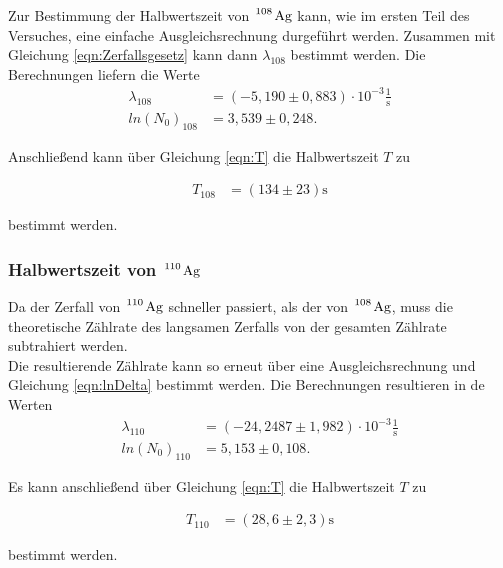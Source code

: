 Zur Bestimmung der Halbwertszeit von $\ce{^108 Ag}$ kann, wie im ersten Teil des Versuches, eine einfache Ausgleichsrechnung durgeführt werden. Zusammen mit
Gleichung \eqref{eqn:Zerfallsgesetz} kann dann $\lambda_{108}$ bestimmt werden. Die Berechnungen liefern die Werte
\begin{align*}
  \lambda_{108} &= (-5,190 \pm 0,883) \cdot 10^{-3} \frac{1}{\si{\second}} \\
  ln(N_0)_{108} &=  3,539 \pm 0,248.
\end{align*}

Anschließend kann über Gleichung \eqref{eqn:T} die Halbwertszeit $T$ zu

\begin{align*}
  T_{108} &= (134 \pm 23) \si{\second}
\end{align*}

bestimmt werden.


\subsubsection{Halbwertszeit von $\ce{^110 Ag}$}

Da der Zerfall von $\ce{^110 Ag}$ schneller passiert, als der von $\ce{^108 Ag}$, muss die theoretische Zählrate des langsamen Zerfalls von der gesamten Zählrate
subtrahiert werden.\\
Die resultierende Zählrate kann so erneut über eine Ausgleichsrechnung und Gleichung \eqref{eqn:lnDelta} bestimmt werden. Die Berechnungen resultieren in de Werten
\begin{align*}
  \lambda_{110} &= (-24,2487 \pm 1,982) \cdot 10^{-3} \frac{1}{\si{\second}} \\
  ln(N_0)_{110} &=  5,153 \pm 0,108.
\end{align*}

Es kann anschließend über Gleichung \eqref{eqn:T} die Halbwertszeit $T$ zu

\begin{align*}
  T_{110} &= (28,6 \pm 2,3) \si{\second}
\end{align*}

bestimmt werden.
